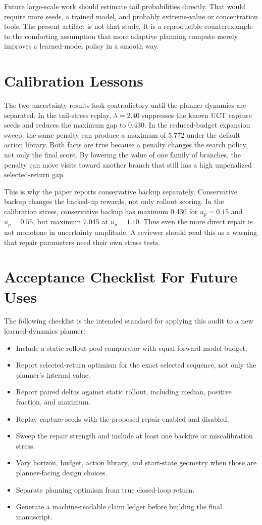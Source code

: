 \documentclass{article}
\begin{document}
Future large-scale work should estimate tail probabilities directly. That would require more seeds, a trained model, and probably extreme-value or concentration tools. The present artifact is not that study. It is a reproducible counterexample to the comforting assumption that more adaptive planning compute merely improves a learned-model policy in a smooth way.

\section{Calibration Lessons}

The two uncertainty results look contradictory until the planner dynamics are separated. In the tail-stress replay, \(\lambda=2.40\) suppresses the known UCT capture seeds and reduces the maximum gap to 0.430. In the reduced-budget expansion sweep, the same penalty can produce a maximum of 5.772 under the default action library. Both facts are true because a penalty changes the search policy, not only the final score. By lowering the value of one family of branches, the penalty can move visits toward another branch that still has a high unpenalized selected-return gap.

This is why the paper reports conservative backup separately. Conservative backup changes the backed-up rewards, not only rollout scoring. In the calibration stress, conservative backup has maximum 0.430 for \(u_p=0.15\) and \(u_p=0.55\), but maximum 7.045 at \(u_p=1.10\). Thus even the more direct repair is not monotone in uncertainty amplitude. A reviewer should read this as a warning that repair parameters need their own stress tests.

\section{Acceptance Checklist For Future Uses}

The following checklist is the intended standard for applying this audit to a new learned-dynamics planner:
\begin{itemize}
\item Include a static rollout-pool comparator with equal forward-model budget.
\item Report selected-return optimism for the exact selected sequence, not only the planner's internal value.
\item Report paired deltas against static rollout, including median, positive fraction, and maximum.
\item Replay capture seeds with the proposed repair enabled and disabled.
\item Sweep the repair strength and include at least one backfire or miscalibration stress.
\item Vary horizon, budget, action library, and start-state geometry when those are planner-facing design choices.
\item Separate planning optimism from true closed-loop return.
\item Generate a machine-readable claim ledger before building the final manuscript.
\end{itemize}
\end{document}
